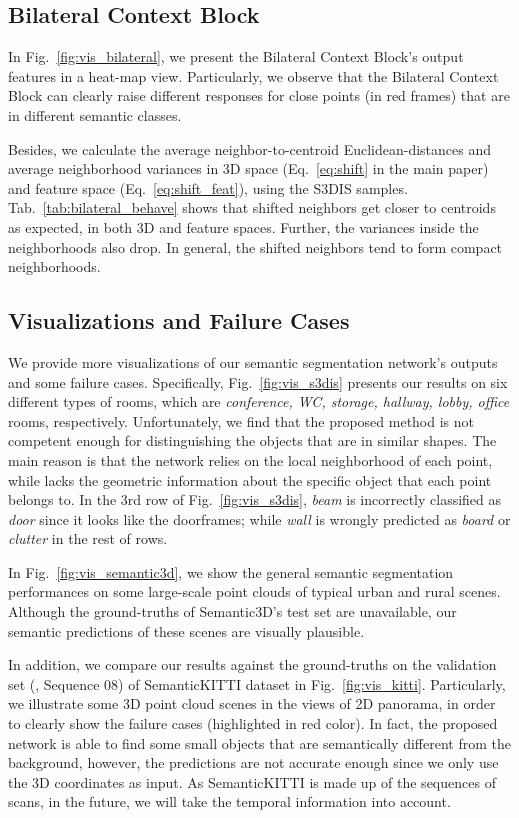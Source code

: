 \documentclass[10pt,twocolumn,letterpaper]{article}
\def\ourblock{Bilateral Context Block}
\begin{document}
\subsection{Bilateral Context Block}
In Fig.~\ref{fig:vis_bilateral}, we present the \ourblock's output features in a heat-map view. Particularly, we observe that the Bilateral Context Block can clearly raise different responses for close points (in red frames) that are in different semantic classes.

Besides, we calculate the average neighbor-to-centroid Euclidean-distances and average neighborhood variances in 3D space (Eq.~\ref{eq:shift} in the main paper) and feature space (Eq.~\ref{eq:shift_feat}), using the S3DIS samples. Tab.~\ref{tab:bilateral_behave} shows that shifted neighbors get closer to centroids as expected, in both 3D and feature spaces. Further, the variances inside the neighborhoods also drop. In general, the shifted neighbors tend to form compact neighborhoods.

\subsection{Visualizations and Failure Cases}
We provide more visualizations of our semantic segmentation network's outputs and some failure cases. Specifically, Fig.~\ref{fig:vis_s3dis} presents our results on six different types of rooms, which are \emph{conference, WC, storage, hallway, lobby, office} rooms, respectively. Unfortunately, we find that the proposed method is not competent enough for distinguishing the objects that are in similar shapes. The main reason is that the network relies on the local neighborhood of each point, while lacks the geometric information about the specific object that each point belongs to. In the 3rd row of Fig.~\ref{fig:vis_s3dis}, \emph{beam} is incorrectly classified as \emph{door} since it looks like the doorframes; while \emph{wall} is wrongly predicted as \emph{board} or \emph{clutter} in the rest of rows.  

In Fig.~\ref{fig:vis_semantic3d}, we show the general semantic segmentation performances on some large-scale point clouds of typical urban and rural scenes. Although the ground-truths of Semantic3D's test set are unavailable, our semantic predictions of these scenes are visually plausible.

In addition, we compare our results against the ground-truths on the validation set (\ie, Sequence 08) of SemanticKITTI dataset in Fig.~\ref{fig:vis_kitti}. Particularly, we illustrate some 3D point cloud scenes in the views of 2D panorama, in order to clearly show the failure cases (highlighted in red color). In fact, the proposed network is able to find some small objects that are semantically different from the background, however, the predictions are not accurate enough since we only use the 3D coordinates as input. As SemanticKITTI is made up of the sequences of scans, in the future, we will take the temporal information into account.
\end{document}
